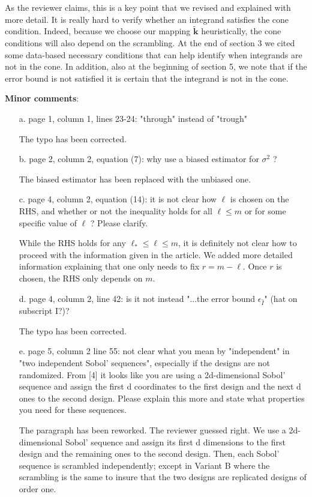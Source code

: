 \documentclass[10pt,a4paper]{article}
\newcommand{\vect}[1]{\boldsymbol{\mathbf{#1}}}
\newcommand{\vk}{\vect{k}}
\newcommand{\answer}[1]{{\color{blue} #1 }}
\begin{document}
\begin{itemize}
\answer{As the reviewer claims, this is a key point that we revised and explained with more detail. It is really hard to verify whether an integrand satisfies the cone condition. Indeed, because we choose our mapping $\tilde{\vk}$ heuristically, the cone conditions will also depend on the scrambling. At the end of section 3 we cited some data-based necessary conditions that can help identify when integrands are not in the cone. In addition, also at the beginning of section 5, we note that if the error bound is not satisfied it is certain that the integrand is not in the cone.}
\end{itemize}


\textbf{Minor comments}:
\begin{itemize}
\item[a.] page 1, column 1, lines 23-24: "through" instead of "trough"

{\color{blue} The typo has been corrected.}
\item[b.] page 2, column 2, equation (7): why use a biased estimator for $\sigma^2$ ?

{\color{blue} The biased estimator has been replaced with the unbiased one.}
\item[c.] page 4, column 2, equation (14): it is not clear how $\ell$ is chosen on the RHS, and whether or not the inequality holds for all $\ell \leq m$ or for some specific value of $\ell$ ? Please clarify.

\answer{While the RHS holds for any $\ell_*\leq\ell\leq m$, it is definitely not clear how to proceed with the information given in the article. We added more detailed information explaining that one only needs to fix $r=m-\ell$. Once $r$ is chosen, the RHS only depends on $m$.}

\item[d.] page 4, column 2, line 42: is it not instead "...the error bound $\epsilon_{\hat{I}}$" (hat on subscript I?)?

{\color{blue} The typo has been corrected.}
\item[e.] page 5, column 2 line 55: not clear what you mean by "independent" in "two independent Sobol' sequences", especially if the designs are not randomized. From [4] it looks like you are using a 2d-dimensional Sobol' sequence and assign the first d coordinates to the first design and the next d ones to the second design. Please explain this more and state what properties you need for these sequences.

{\color{blue} The paragraph has been reworked. The reviewer guessed right. We use a 2d-dimensional Sobol' sequence and assign its first d dimensions to the first design and the remaining ones to the second design. Then, each Sobol' sequence is scrambled independently; except in Variant B where the scrambling is the same to insure that the two designs are replicated designs of order one.

}
\end{itemize}
\end{document}
